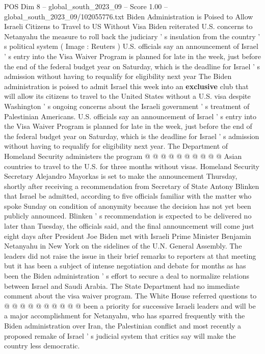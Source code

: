 \begin{textsample}{POS Dim 8 – global\_south\_2023\_09 – Score 1.00 – global\_south\_2023\_09/102055776.txt}  \label{ex:f8_pos_443}
Biden Administration is Poised to Allow Israeli Citizens to Travel to US Without Visa Biden reiterated U.S. concerns to Netanyahu the measure to roll back the judiciary ' s insulation from the country ' s political system ( Image : Reuters ) U.S. officials say an announcement of Israel ' s entry into the Visa Waiver Program is planned for late in the week, just before the end of the federal budget year on Saturday, which is the deadline for Israel ' s admission without having to requalify for eligibility next year The Biden administration is poised to admit Israel this week into an \textbf{exclusive} club that will allow its citizens to travel to the United States without a U.S. visa despite Washington ' s ongoing concerns about the Israeli government ' s treatment of Palestinian Americans.
U.S. officials say an announcement of Israel ' s entry into the Visa Waiver Program is planned for late in the week, just before the end of the federal budget year on Saturday, which is the deadline for Israel ' s admission without having to requalify for eligibility next year.
The Department of Homeland Security administers the program @ @ @ @ @ @ @ @ @ @ Asian countries to travel to the U.S. for three months without visas.
Homeland Security Secretary Alejandro Mayorkas is set to make the announcement Thursday, shortly after receiving a recommendation from Secretary of State Antony Blinken that Israel be admitted, according to five officials familiar with the matter who spoke Sunday on condition of anonymity because the decision has not yet been publicly announced.
Blinken ' s recommendation is expected to be delivered no later than Tuesday, the officials said, and the final announcement will come just eight days after President Joe Biden met with Israeli Prime Minister Benjamin Netanyahu in New York on the sidelines of the U.N.
General Assembly.
The leaders did not raise the issue in their brief remarks to reporters at that meeting but it has been a subject of intense negotiation and debate for months as has been the Biden administration ' s effort to secure a deal to normalize relations between Israel and Saudi Arabia.
The State Department had no immediate comment about the visa waiver program.
The White House referred questions to @ @ @ @ @ @ @ @ @ @ been a priority for successive Israeli leaders and will be a major accomplishment for Netanyahu, who has sparred frequently with the Biden administration over Iran, the Palestinian conflict and most recently a proposed remake of Israel ' s judicial system that critics say will make the country less democratic.

\end{textsample}
